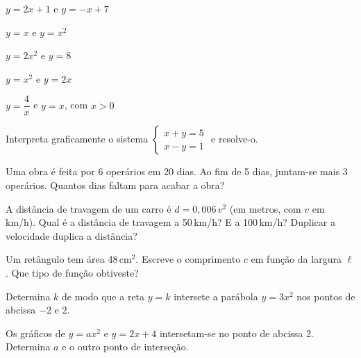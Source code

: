 \documentclass[12pt]{article}
\begin{document}
\begin{exercicios}
  \item $y = 2x + 1$ \; e \; $y = -x + 7$
  \item $y = x$ \; e \; $y = x^2$
  \item $y = 2x^2$ \; e \; $y = 8$
  \item $y = x^2$ \; e \; $y = 2x$
  \item $y = \dfrac{4}{x}$ \; e \; $y = x$, com $x > 0$
  \item Interpreta graficamente o sistema $\begin{cases} x + y = 5 \\ x - y = 1 \end{cases}$ e resolve-o.
\end{exercicios}

\begin{exercicios}
  \item Uma obra é feita por 6 operários em 20 dias. Ao fim de 5 dias, juntam-se mais 3 operários. Quantos dias faltam para acabar a obra?
  \item A distância de travagem de um carro é $d = 0{,}006\,v^2$ (em metros, com $v$ em km/h). Qual é a distância de travagem a 50\,km/h? E a 100\,km/h? Duplicar a velocidade duplica a distância?
  \item Um retângulo tem área 48\,cm$^2$. Escreve o comprimento $c$ em função da largura $\ell$. Que tipo de função obtiveste?
  \item Determina $k$ de modo que a reta $y = k$ intersete a parábola $y = 3x^2$ nos pontos de abcissa $-2$ e $2$.
  \item Os gráficos de $y = ax^2$ e $y = 2x + 4$ intersetam-se no ponto de abcissa 2. Determina $a$ e o outro ponto de interseção.
\end{exercicios}
\end{document}
